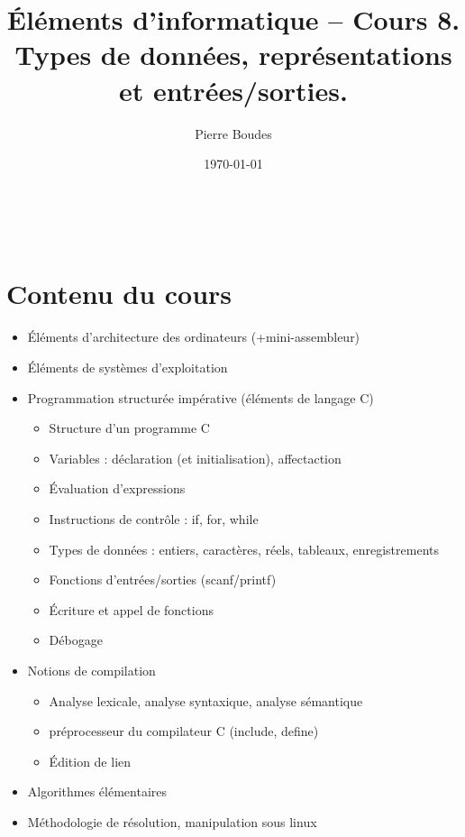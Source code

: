 \documentclass[xcolor=svgnames]{beamer}
\title{Éléments d'informatique -- Cours 8. Types de données, représentations et entrées/sorties.}
\author{Pierre Boudes}
\date{\today}
\begin{document}
\begin{frame}
	\titlepage
	\vfill
	\begin{center}
		\\[2.5ex]
		{\tiny\CcNote{\CcLongnameByNcSa}}
		\vspace*{-2.5ex}
	\end{center}
\end{frame}

\section[Plan]{}
\frame[label=plan]{\tableofcontents}

 \section*{Contenu du cours}
\begin{frame}
 \begin{itemize}
  \item {Éléments d'architecture des ordinateurs (+mini-assembleur)}\nowrite
  \item {Éléments de systèmes d'exploitation}
\item Programmation structurée impérative (éléments de langage C)
\begin{itemize}
  \item {Structure d'un programme C}
  \item {Variables : déclaration (et initialisation), affectaction}
  \item {Évaluation d'expressions}
  \item {Instructions de contrôle : if, for, while}
  \item \alert{Types de données : entiers, caractères,
    réels}, {tableaux}, enregistrements
  \item \alert{Fonctions d'entrées/sorties (scanf/printf)}
  \item Écriture et appel de fonctions
  \item Débogage
\end{itemize}
\item {Notions de compilation
  \begin{itemize}
  \item Analyse lexicale, analyse syntaxique, analyse sémantique
  \item préprocesseur du compilateur C (include, define)
   \item Édition de lien
  \end{itemize}}
\item Algorithmes élémentaires
\item Méthodologie de résolution, manipulation sous linux
\end{itemize}
\end{frame}
\end{document}
